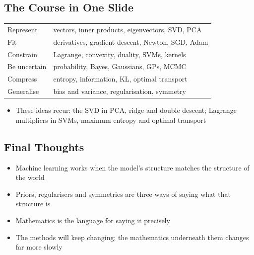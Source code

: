 \begin{slide}
\section[-2]{The Course in One Slide}

\begin{center}
  \begin{tabular}{l|l}
    Represent & vectors, inner products, eigenvectors, SVD, PCA\pause \\
    Fit & derivatives, gradient descent, Newton, SGD, Adam\pause \\
    Constrain & Lagrange, convexity, duality, SVMs, kernels\pause \\
    Be uncertain & probability, Bayes, Gaussians, GPs, MCMC\pause \\
    Compress & entropy, information, KL, optimal transport\pause \\
    Generalise & bias and variance, regularisation, symmetry\pause
  \end{tabular}
\end{center}
\begin{PauseHighLight}
  \begin{itemize}
  \item These ideas recur: the SVD in PCA, ridge and double descent;
    Lagrange multipliers in SVMs, maximum entropy and optimal
    transport\pause
  \end{itemize}
\end{PauseHighLight}

\end{slide}

\begin{slide}
\section{Final Thoughts}

\begin{PauseHighLight}
  \begin{itemize}
  \item Machine learning works when the model's structure matches the
    structure of the world\pause
  \item Priors, regularisers and symmetries are three ways of saying
    what that structure is\pause
  \item Mathematics is the language for saying it precisely\pause
  \item The methods will keep changing; the mathematics underneath them
    changes far more slowly\pause
  \end{itemize}
\end{PauseHighLight}

\end{slide}





